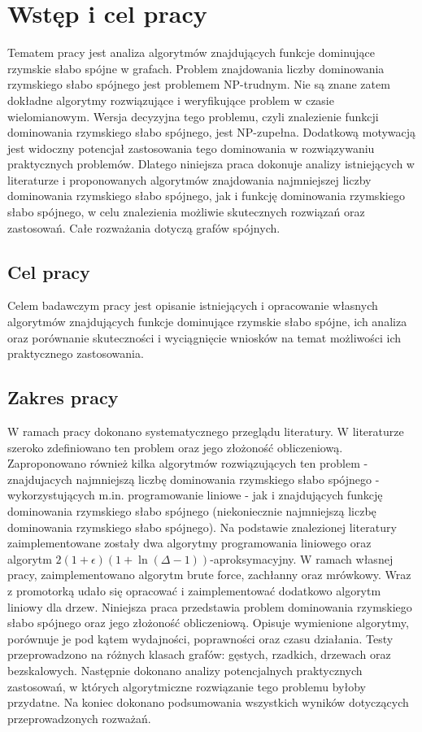 \chapter{Wstęp i cel pracy}
Tematem pracy jest analiza algorytmów znajdujących funkcje dominujące rzymskie słabo spójne w grafach.
Problem znajdowania liczby dominowania rzymskiego słabo spójnego jest problemem NP-trudnym. Nie są znane zatem dokładne algorytmy rozwiązujące i weryfikujące problem w czasie wielomianowym. Wersja decyzyjna tego problemu, czyli znalezienie funkcji dominowania rzymskiego słabo spójnego, jest NP-zupełna. Dodatkową motywacją jest widoczny potencjał zastosowania tego dominowania w rozwiązywaniu praktycznych problemów. Dlatego niniejsza praca dokonuje analizy istniejących w literaturze i proponowanych algorytmów znajdowania najmniejszej liczby dominowania rzymskiego słabo spójnego, jak i funkcję dominowania rzymskiego słabo spójnego, w celu znalezienia możliwie skutecznych rozwiązań oraz zastosowań. Całe rozważania dotyczą grafów spójnych.

\section{Cel pracy}
Celem badawczym pracy jest opisanie istniejących i opracowanie własnych algorytmów znajdujących funkcje dominujące rzymskie słabo spójne, ich analiza oraz porównanie skuteczności i wyciągnięcie wniosków na temat możliwości ich praktycznego zastosowania.

\section{Zakres pracy}
W ramach pracy dokonano systematycznego przeglądu literatury. W literaturze szeroko zdefiniowano ten problem oraz jego złożoność obliczeniową. Zaproponowano również kilka algorytmów rozwiązujących ten problem - znajdujacych najmniejszą liczbę dominowania rzymskiego słabo spójnego - wykorzystujących m.in. programowanie liniowe - jak i znajdujących funkcję dominowania rzymskiego słabo spójnego (niekoniecznie najmniejszą liczbę dominowania rzymskiego słabo spójnego). Na podstawie znalezionej literatury zaimplementowane zostały dwa algorytmy programowania liniowego oraz algorytm $2(1+\epsilon)(1 + \ln(\Delta - 1))$-aproksymacyjny. W ramach własnej pracy, zaimplementowano algorytm brute force, zachłanny oraz mrówkowy. Wraz z promotorką udało się opracować i zaimplementować dodatkowo algorytm liniowy dla drzew. Niniejsza praca przedstawia problem dominowania rzymskiego słabo spójnego oraz jego złożoność obliczeniową. Opisuje wymienione algorytmy, porównuje je pod kątem wydajności, poprawności oraz czasu działania. Testy przeprowadzono na różnych klasach grafów: gęstych, rzadkich, drzewach oraz bezskalowych. Następnie dokonano analizy potencjalnych praktycznych zastosowań, w których algorytmiczne rozwiązanie tego problemu byłoby przydatne. Na koniec dokonano podsumowania wszystkich wyników dotyczących przeprowadzonych rozważań.